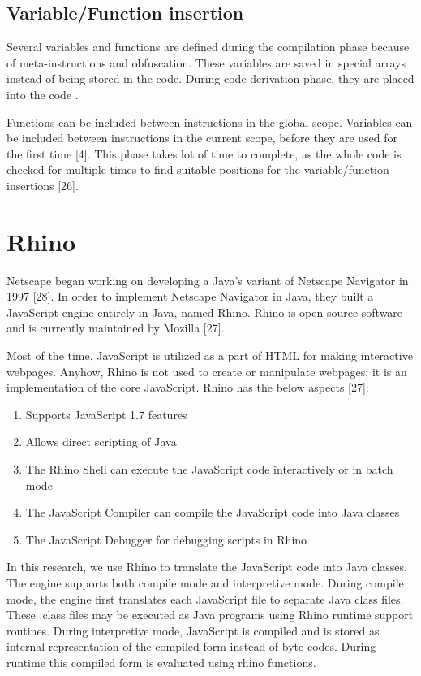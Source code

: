\subsection{Variable/Function insertion}

Several variables and functions are defined during the compilation phase because of meta-instructions and obfuscation. These variables are saved in special arrays instead of being stored in the code. During code derivation phase, they are placed into the code .

Functions can be included between instructions in the global scope. Variables can be included between instructions in the current scope, before they are used for the first time [4]. This phase takes lot of time to complete, as the whole code is checked for multiple times to find suitable positions for the variable/function insertions [26].


\section{Rhino}

Netscape began working on developing a Java’s variant of Netscape Navigator in 1997 [28]. In order to implement Netscape Navigator in Java, they built a JavaScript engine entirely in Java, named Rhino. Rhino is open source software and is currently maintained by Mozilla [27].

Most of the time, JavaScript is utilized as a part of HTML for making interactive webpages. Anyhow, Rhino is not used to create or manipulate webpages; it is an implementation of the core JavaScript. Rhino has the below aspects [27]:

\begin{enumerate}
\item Supports JavaScript 1.7 features
\item Allows direct scripting of Java
\item The Rhino Shell can execute the JavaScript code interactively or in batch mode
\item The JavaScript Compiler can compile the JavaScript code into Java classes
\item The JavaScript Debugger for debugging scripts in Rhino
\end{enumerate}
 
In this research, we use Rhino to translate the JavaScript code into Java classes. The engine supports both compile mode and interpretive mode. During compile mode, the engine first translates each JavaScript file to separate Java class files. These .class files may be executed as Java programs using Rhino runtime support routines. During interpretive mode, JavaScript is compiled and is stored as internal representation of the compiled form instead of byte codes. During runtime this compiled form is evaluated using rhino functions.

